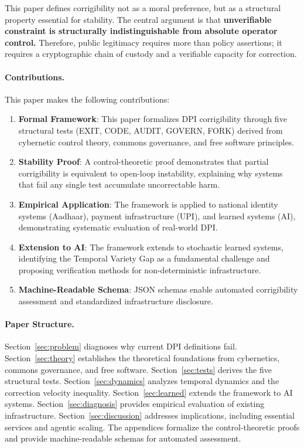 \documentclass{article}
\begin{document}
This paper defines corrigibility not as a moral preference, but as a structural property essential for stability. The central argument is that \textbf{unverifiable constraint is structurally indistinguishable from absolute operator control.} Therefore, public legitimacy requires more than policy assertions; it requires a cryptographic chain of custody and a verifiable capacity for correction.

\paragraph{Contributions.} This paper makes the following contributions:
\begin{enumerate}[noitemsep]
    \item \textbf{Formal Framework}: This paper formalizes DPI corrigibility through five structural tests (EXIT, CODE, AUDIT, GOVERN, FORK) derived from cybernetic control theory, commons governance, and free software principles.
    \item \textbf{Stability Proof}: A control-theoretic proof demonstrates that partial corrigibility is equivalent to open-loop instability, explaining why systems that fail any single test accumulate uncorrectable harm.
    \item \textbf{Empirical Application}: The framework is applied to national identity systems (Aadhaar), payment infrastructure (UPI), and learned systems (AI), demonstrating systematic evaluation of real-world DPI.
    \item \textbf{Extension to AI}: The framework extends to stochastic learned systems, identifying the Temporal Variety Gap as a fundamental challenge and proposing verification methods for non-deterministic infrastructure.
    \item \textbf{Machine-Readable Schema}: JSON schemas enable automated corrigibility assessment and standardized infrastructure disclosure.
\end{enumerate}

\paragraph{Paper Structure.} Section~\ref{sec:problem} diagnoses why current DPI definitions fail. Section~\ref{sec:theory} establishes the theoretical foundations from cybernetics, commons governance, and free software. Section~\ref{sec:tests} derives the five structural tests. Section~\ref{sec:dynamics} analyzes temporal dynamics and the correction velocity inequality. Section~\ref{sec:learned} extends the framework to AI systems. Section~\ref{sec:diagnosis} provides empirical evaluation of existing infrastructure. Section~\ref{sec:discussion} addresses implications, including essential services and agentic scaling. The appendices formalize the control-theoretic proofs and provide machine-readable schemas for automated assessment.
\end{document}
